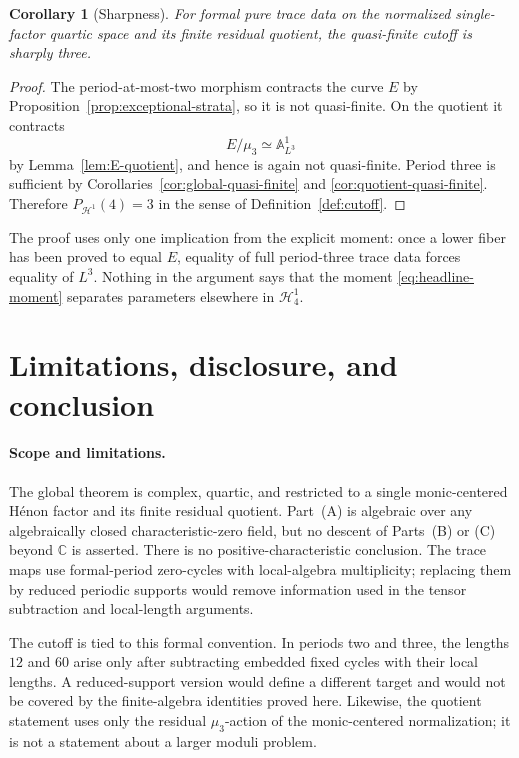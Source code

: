 \documentclass[11pt]{article}
\newtheorem{corollary}[theorem]{Corollary}
\theoremstyle{definition}
\newcommand{\C}{\mathbb C}
\newcommand{\A}{\mathbb A}
\newcommand{\Hn}{\mathcal H}
\begin{document}
\begin{corollary}[Sharpness]
\label{cor:sharpness}
For formal pure trace data on the normalized single-factor quartic space and its finite residual quotient, the quasi-finite cutoff is sharply three.
\end{corollary}

\begin{proof}
The period-at-most-two morphism contracts the curve $E$ by Proposition~\ref{prop:exceptional-strata}, so it is not quasi-finite. On the quotient it contracts
\[
E/\mu_3\simeq\A^1_{L^3}
\]
by Lemma~\ref{lem:E-quotient}, and hence is again not quasi-finite. Period three is sufficient by Corollaries~\ref{cor:global-quasi-finite} and \ref{cor:quotient-quasi-finite}. Therefore $P_{\Hn^1}(4)=3$ in the sense of Definition~\ref{def:cutoff}.
\end{proof}

The proof uses only one implication from the explicit moment: once a lower fiber has been proved to equal $E$, equality of full period-three trace data forces equality of $L^3$. Nothing in the argument says that the moment \eqref{eq:headline-moment} separates parameters elsewhere in $\Hn^1_4$.

\section{Limitations, disclosure, and conclusion}
\label{sec:conclusion}

\paragraph{Scope and limitations.}
The global theorem is complex, quartic, and restricted to a single monic-centered H\'enon factor and its finite residual quotient. Part~\textnormal{(A)} is algebraic over any algebraically closed characteristic-zero field, but no descent of Parts~\textnormal{(B)} or \textnormal{(C)} beyond $\C$ is asserted. There is no positive-characteristic conclusion. The trace maps use formal-period zero-cycles with local-algebra multiplicity; replacing them by reduced periodic supports would remove information used in the tensor subtraction and local-length arguments.

The cutoff is tied to this formal convention. In periods two and three, the lengths $12$ and $60$ arise only after subtracting embedded fixed cycles with their local lengths. A reduced-support version would define a different target and would not be covered by the finite-algebra identities proved here. Likewise, the quotient statement uses only the residual $\mu_3$-action of the monic-centered normalization; it is not a statement about a larger moduli problem.
\end{document}
